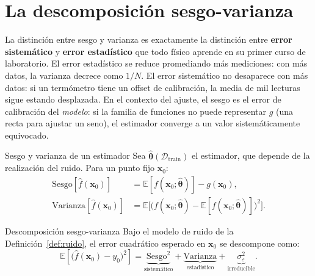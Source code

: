 \section{La descomposición sesgo-varianza}
\label{sec:sesgvar}


La distinción entre sesgo y varianza es exactamente la distinción entre
\textbf{error sistemático} y \textbf{error estadístico} que todo físico
aprende en su primer curso de laboratorio. El error estadístico se
reduce promediando más mediciones: con más datos, la varianza decrece
como $1/N$. El error sistemático no desaparece con más datos: si un
termómetro tiene un offset de calibración, la media de mil lecturas
sigue estando desplazada. En el contexto del ajuste, el sesgo es el
error de calibración del \emph{modelo}: si la familia de funciones no
puede representar $g$ (una recta para ajustar un seno), el estimador
converge a un valor sistemáticamente equivocado.

\begin{definicion}{Sesgo y varianza de un estimador}
\label{def:sesgvar}
Sea $\hat{\bm{\theta}}(\mathcal{D}_{\text{train}})$ el estimador, que
depende de la realización del ruido. Para un punto fijo $\bm{x}_0$:
\begin{align}
  \text{Sesgo}[\hat{f}(\bm{x}_0)]
  &= \mathbb{E}[f(\bm{x}_0;\hat{\bm{\theta}})] - g(\bm{x}_0),
  \label{eq:sesgo}\\
  \text{Varianza}[\hat{f}(\bm{x}_0)]
  &= \mathbb{E}\bigl[\bigl(f(\bm{x}_0;\hat{\bm{\theta}})
  - \mathbb{E}[f(\bm{x}_0;\hat{\bm{\theta}})]\bigr)^2\bigr].
  \label{eq:varianza}
\end{align}
\end{definicion}

\begin{teorema}{Descomposición sesgo-varianza}
\label{thm:biasvar}
Bajo el modelo de ruido de la Definición~\ref{def:ruido}, el error
cuadrático esperado en $\bm{x}_0$ se descompone como:
\begin{equation}
  \mathbb{E}\left[\bigl(\hat{f}(\bm{x}_0) - y_0\bigr)^2\right]
  = \underbrace{\text{Sesgo}^2}_{\text{sistemático}}
  + \underbrace{\text{Varianza}}_{\text{estadístico}}
  + \underbrace{\sigma_\varepsilon^2}_{\text{irreducible}}.
  \label{eq:biasvar}
\end{equation}
\end{teorema}

